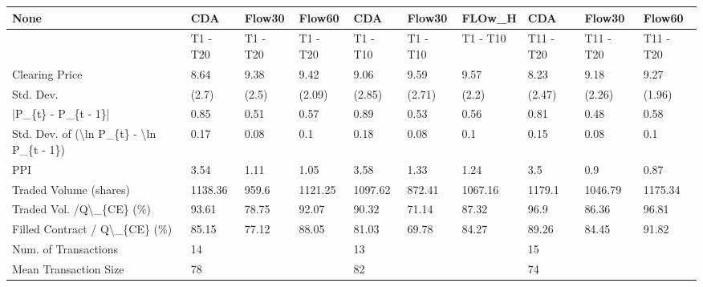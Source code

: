 \begin{tabular}{llllllllll}
\hline
 None                                                      & CDA      & Flow30    & Flow60    & CDA      & Flow30    & FLOw\_H   & CDA       & Flow30     & Flow60     \\
\hline
                                                           & T1 - T20 & T1 - T20 & T1 - T20 & T1 - T10 & T1 - T10 & T1 - T10 & T11 - T20 & T11 - T20 & T11 - T20 \\
 Clearing Price                                            & 8.64     & 9.38     & 9.42     & 9.06     & 9.59     & 9.57     & 8.23      & 9.18      & 9.27      \\
 Std. Dev.                                                 & (2.7)    & (2.5)    & (2.09)   & (2.85)   & (2.71)   & (2.2)    & (2.47)    & (2.26)    & (1.96)    \\
 |P\_\{t\} - P\_\{t - 1\}|                                       & 0.85     & 0.51     & 0.57     & 0.89     & 0.53     & 0.56     & 0.81      & 0.48      & 0.58      \\
 Std. Dev. of (\textbackslash{}ln P\_\{t\} - \textbackslash{}ln P\_\{t - 1\})                  & 0.17     & 0.08     & 0.1      & 0.18     & 0.08     & 0.1      & 0.15      & 0.08      & 0.1       \\
 PPI                                                       & 3.54     & 1.11     & 1.05     & 3.58     & 1.33     & 1.24     & 3.5       & 0.9       & 0.87      \\
 Traded Volume (shares)                                    & 1138.36  & 959.6    & 1121.25  & 1097.62  & 872.41   & 1067.16  & 1179.1    & 1046.79   & 1175.34   \\
 Traded Vol. /Q\textbackslash{}\_\{CE\} (\%)                                  & 93.61    & 78.75    & 92.07    & 90.32    & 71.14    & 87.32    & 96.9      & 86.36     & 96.81     \\
 Filled Contract / Q\textbackslash{}\_\{CE\} (\%)                             & 85.15    & 77.12    & 88.05    & 81.03    & 69.78    & 84.27    & 89.26     & 84.45     & 91.82     \\
 Num. of Transactions                                      & 14       &          &          & 13       &          &          & 15        &           &           \\
 Mean Transaction Size                                     & 78       &          &          & 82       &          &          & 74        &           &           \\

\end{tabular}

